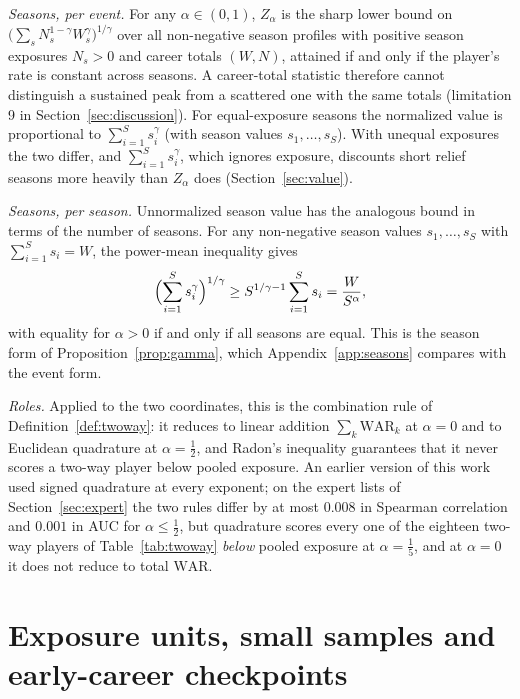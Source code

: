 \documentclass[11pt,letterpaper]{article}
\theoremstyle{plain}
\theoremstyle{definition}
\theoremstyle{remark}
\newcommand{\WAR}{\mathrm{WAR}}
\begin{document}
\emph{Seasons, per event.} For any $\alpha \in (0,1)$, $Z_\alpha$ is the sharp lower bound on $\bigl(\sum_s N_s^{1-\gamma} W_s^{\gamma}\bigr)^{1/\gamma}$ over all non-negative season profiles with positive season exposures $N_s > 0$ and career totals $(W, N)$, attained if and only if the player's rate is constant across seasons. A career-total statistic therefore cannot distinguish a sustained peak from a scattered one with the same totals (limitation 9 in Section~\ref{sec:discussion}). For equal-exposure seasons the normalized value is proportional to $\sum_{i=1}^S s_i^{\gamma}$ (with season values $s_1, \dots, s_S$). With unequal exposures the two differ, and $\sum_{i=1}^S s_i^{\gamma}$, which ignores exposure, discounts short relief seasons more heavily than $Z_\alpha$ does (Section~\ref{sec:value}).

\emph{Seasons, per season.} Unnormalized season value has the analogous bound in terms of the number of seasons. For any non-negative season values $s_1, \dots, s_S$ with $\sum_{i=1}^S s_i = W$, the power-mean inequality gives
\begin{equation}
    \Bigl(\sum_{i=1}^S s_i^{\gamma}\Bigr)^{1/\gamma} \ge S^{1/\gamma - 1} \sum_{i=1}^S s_i = \frac{W}{S^{\alpha}},
\end{equation}
with equality for $\alpha > 0$ if and only if all seasons are equal. This is the season form of Proposition~\ref{prop:gamma}, which Appendix~\ref{app:seasons} compares with the event form.

\emph{Roles.} Applied to the two coordinates, this is the combination rule of Definition~\ref{def:twoway}: it reduces to linear addition $\sum_k \WAR_k$ at $\alpha = 0$ and to Euclidean quadrature at $\alpha = \tfrac12$, and Radon's inequality guarantees that it never scores a two-way player below pooled exposure. An earlier version of this work used signed quadrature at every exponent; on the expert lists of Section~\ref{sec:expert} the two rules differ by at most $0.008$ in Spearman correlation and $0.001$ in AUC for $\alpha \le \tfrac12$, but quadrature scores every one of the eighteen two-way players of Table~\ref{tab:twoway} \emph{below} pooled exposure at $\alpha = \tfrac15$, and at $\alpha = 0$ it does not reduce to total $\WAR$.

\section{Exposure units, small samples and early-career checkpoints}
\label{app:units}
\end{document}
